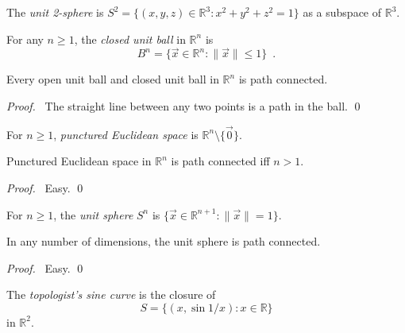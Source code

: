 \begin{df}
  The \emph{unit 2-sphere} is $S^2 = \{ (x, y, z) \in \mathbb{R}^3 : x^2 +
  y^2 + z^2 = 1 \}$ as a subspace of $\mathbb{R}^3$.
\end{df}

\begin{df}
  For any $n \geq 1$, the \emph{closed unit ball} in $\mathbb{R}^n$ is
  \[ B^n = \{ \vec{x} \in \mathbb{R}^n : \| \vec{x} \| \leq 1 \} \enspace . \]
\end{df}

\begin{prop}
  Every open unit ball and closed unit ball in $\mathbb{R}^n$ is path
  connected.
\end{prop}

\begin{proof}
  \pf\ The straight line between any two points is a path in the ball. \qed
\end{proof}

\begin{df}
  For $n \geq 1$, \emph{punctured Euclidean space} is $\mathbb{R}^n \setminus
  \{ \vec{0} \}$.
\end{df}

\begin{prop}
  Punctured Euclidean space in $\mathbb{R}^n$ is path connected iff $n > 1$.
\end{prop}

\begin{proof}
  \pf\ Easy. \qed
\end{proof}

\begin{df}
  For $n \geq 1$, the \emph{unit sphere} $S^n$ is $\{ \vec{x} \in
  \mathbb{R}^{n+1} : \| \vec{x} \| = 1 \}$.
\end{df}

\begin{prop}
  In any number of dimensions, the unit sphere is path connected.
\end{prop}

\begin{proof}
  \pf\ Easy. \qed
\end{proof}

\begin{df}
  The \emph{topologist's sine curve} is the closure of
  \[ S = \{ (x, \sin 1/x) : x \in \mathbb{R} \} \]
  in $\mathbb{R}^2$.
\end{df}

